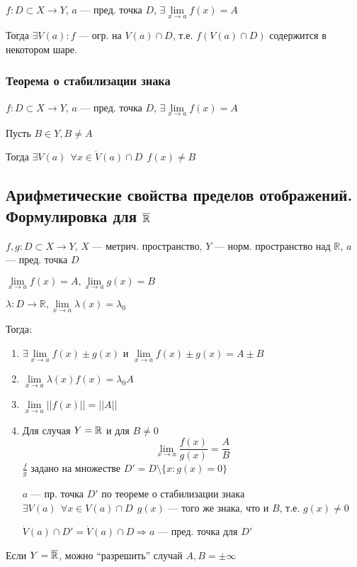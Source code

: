 $f: D\subset X\to Y$, $a$ --- пред. точка $D$, $\exists\lim\limits_{x\to a} f(x)=A$

Тогда $\exists V(a) : f$ --- огр. на $V(a)\cap D$, т.е. $f(V(a)\cap D)$ содержится в некотором шаре.

\subsubsection{Теорема о стабилизации знака}

$f: D\subset X\to Y$, $a$ --- пред. точка $D$, $\exists\lim\limits_{x\to a} f(x)=A$

Пусть $B\in Y, B\not=A$

Тогда $\exists V(a) \ \ \forall x \in \dot V(a)\cap D \ \ f(x)\not = B$

\subsection{Арифметические свойства пределов отображений. Формулировка для $\overline{\operatorname*{\mathbb{R}}}$}

$f,g: D\subset X\to Y$, $X$ --- метрич. пространство, $Y$ --- норм. пространство над $\mathbb{R}$, $a$ --- пред. точка $D$

$\lim\limits_{x\to a}f(x)=A, \lim\limits_{x\to a}g(x)=B$

$\lambda: D\to \mathbb{R}, \lim\limits_{x\to a}\lambda (x) = \lambda_0$

Тогда:
\begin{enumerate}
    \item $\exists\lim\limits_{x\to a} f(x)\pm g(x)$ и $\lim\limits_{x\to a} f(x)\pm g(x)=A\pm B$
    \item $\lim\limits_{x\to a} \lambda(x) f(x) = \lambda_0A$
    \item $\lim\limits_{x\to a} ||f(x)||=||A||$
    \item Для случая $Y=\operatorname*{\mathbb{R}}$ и для $B\not=0$ $$\lim\limits_{x\to a}\frac{f(x)}{g(x)}=\frac{A}{B}$$
    $\frac{f}{g}$ задано на множестве $D'=D\setminus \{x:g(x)=0\}$

    $a$ --- пр. точка $D'$ по теореме о стабилизации знака $\exists V(a) \ \ \forall x\in V(a)\cap D \ \ g(x)$ --- того же знака, что и $B$, т.е. $g(x)\not = 0$

    $\dot V(a)\cap D'=\dot V(a)\cap D \Rightarrow a$ --- пред. точка для $D'$
\end{enumerate}

Если $Y=\overline{\operatorname*{\mathbb{R}}}$, можно ``разрешить'' случай $A, B=\pm \infty$

